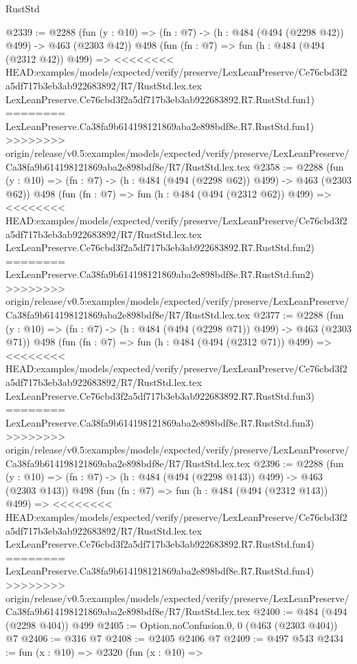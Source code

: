 \begin{lexlean}{RustStd}
\begin{coremodule}
{\begin{coremodule}
{{{{{{{{{@2339 := @2288
    (fun (y : @10) => (fn : @7) -> (h : @484 (@494 (@2298 @42)) @499) -> @463 (@2303 @42))
    @498
    (fun (fn : @7) =>
    fun (h : @484 (@494 (@2312 @42)) @499) =>
<<<<<<<< HEAD:examples/models/expected/verify/preserve/LexLeanPreserve/Ce76cbd3f2a5df717b3eb3ab922683892/R7/RustStd.lex.tex
    LexLeanPreserve.Ce76cbd3f2a5df717b3eb3ab922683892.R7.RustStd.fun1)
========
    LexLeanPreserve.Ca38fa9b614198121869aba2e898bdf8e.R7.RustStd.fun1)
>>>>>>>> origin/release/v0.5:examples/models/expected/verify/preserve/LexLeanPreserve/Ca38fa9b614198121869aba2e898bdf8e/R7/RustStd.lex.tex
@2358 := @2288
    (fun (y : @10) => (fn : @7) -> (h : @484 (@494 (@2298 @62)) @499) -> @463 (@2303 @62))
    @498
    (fun (fn : @7) =>
    fun (h : @484 (@494 (@2312 @62)) @499) =>
<<<<<<<< HEAD:examples/models/expected/verify/preserve/LexLeanPreserve/Ce76cbd3f2a5df717b3eb3ab922683892/R7/RustStd.lex.tex
    LexLeanPreserve.Ce76cbd3f2a5df717b3eb3ab922683892.R7.RustStd.fun2)
========
    LexLeanPreserve.Ca38fa9b614198121869aba2e898bdf8e.R7.RustStd.fun2)
>>>>>>>> origin/release/v0.5:examples/models/expected/verify/preserve/LexLeanPreserve/Ca38fa9b614198121869aba2e898bdf8e/R7/RustStd.lex.tex
@2377 := @2288
    (fun (y : @10) => (fn : @7) -> (h : @484 (@494 (@2298 @71)) @499) -> @463 (@2303 @71))
    @498
    (fun (fn : @7) =>
    fun (h : @484 (@494 (@2312 @71)) @499) =>
<<<<<<<< HEAD:examples/models/expected/verify/preserve/LexLeanPreserve/Ce76cbd3f2a5df717b3eb3ab922683892/R7/RustStd.lex.tex
    LexLeanPreserve.Ce76cbd3f2a5df717b3eb3ab922683892.R7.RustStd.fun3)
========
    LexLeanPreserve.Ca38fa9b614198121869aba2e898bdf8e.R7.RustStd.fun3)
>>>>>>>> origin/release/v0.5:examples/models/expected/verify/preserve/LexLeanPreserve/Ca38fa9b614198121869aba2e898bdf8e/R7/RustStd.lex.tex
@2396 := @2288
    (fun (y : @10) => (fn : @7) -> (h : @484 (@494 (@2298 @143)) @499) -> @463 (@2303 @143))
    @498
    (fun (fn : @7) =>
    fun (h : @484 (@494 (@2312 @143)) @499) =>
<<<<<<<< HEAD:examples/models/expected/verify/preserve/LexLeanPreserve/Ce76cbd3f2a5df717b3eb3ab922683892/R7/RustStd.lex.tex
    LexLeanPreserve.Ce76cbd3f2a5df717b3eb3ab922683892.R7.RustStd.fun4)
========
    LexLeanPreserve.Ca38fa9b614198121869aba2e898bdf8e.R7.RustStd.fun4)
>>>>>>>> origin/release/v0.5:examples/models/expected/verify/preserve/LexLeanPreserve/Ca38fa9b614198121869aba2e898bdf8e/R7/RustStd.lex.tex
@2400 := @484 (@494 (@2298 @404)) @499
@2405 := Option.noConfusion.{0, 0} (@463 (@2303 @404)) @7
@2406 := @316 @7
@2408 := @2405 @2406 @7
@2409 := @497 @543
@2434 := fun (x : @10) =>
  @2320
    (fun (x : @10) =>
}}}}}}}}}
\end{coremodule}}
\end{coremodule}
\end{lexlean}

